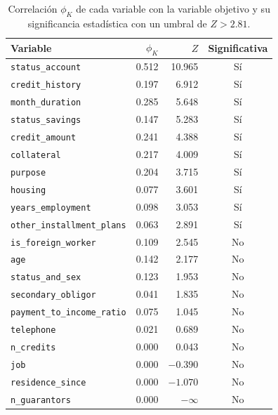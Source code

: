 \documentclass{ieeeaccess}
\begin{document}
\begin{table}[htbp]
  \caption{Correlación $\phi_K$ de cada variable con la variable objetivo y su significancia estadística con un umbral de $Z > 2.81$.}
  \label{tab:phik}
  \centering
  \begin{tabular}{lrrc}
    \toprule
    Variable & $\phi_K$ & $Z$ & Significativa \\
    \midrule
    \texttt{status\_account}           & 0.512 & 10.965       & Sí \\
    \texttt{credit\_history}           & 0.197 & 6.912        & Sí \\
    \texttt{month\_duration}           & 0.285 & 5.648        & Sí \\
    \texttt{status\_savings}           & 0.147 & 5.283        & Sí \\
    \texttt{credit\_amount}            & 0.241 & 4.388        & Sí \\
    \texttt{collateral}                & 0.217 & 4.009        & Sí \\
    \texttt{purpose}                   & 0.204 & 3.715        & Sí \\
    \texttt{housing}                   & 0.077 & 3.601        & Sí \\
    \texttt{years\_employment}         & 0.098 & 3.053        & Sí \\
    \texttt{other\_installment\_plans} & 0.063 & 2.891        & Sí \\
    \texttt{is\_foreign\_worker}       & 0.109 & 2.545        & No  \\
    \texttt{age}                       & 0.142 & 2.177        & No  \\
    \texttt{status\_and\_sex}          & 0.123 & 1.953        & No  \\
    \texttt{secondary\_obligor}        & 0.041 & 1.835        & No  \\
    \texttt{payment\_to\_income\_ratio}& 0.075 & 1.045        & No  \\
    \texttt{telephone}                 & 0.021 & 0.689        & No  \\
    \texttt{n\_credits}                & 0.000 & 0.043        & No  \\
    \texttt{job}                       & 0.000 & $-0.390$     & No  \\
    \texttt{residence\_since}          & 0.000 & $-1.070$     & No  \\
    \texttt{n\_guarantors}             & 0.000 & $-\infty$    & No  \\
    \bottomrule
  \end{tabular}
\end{table}
\end{document}
